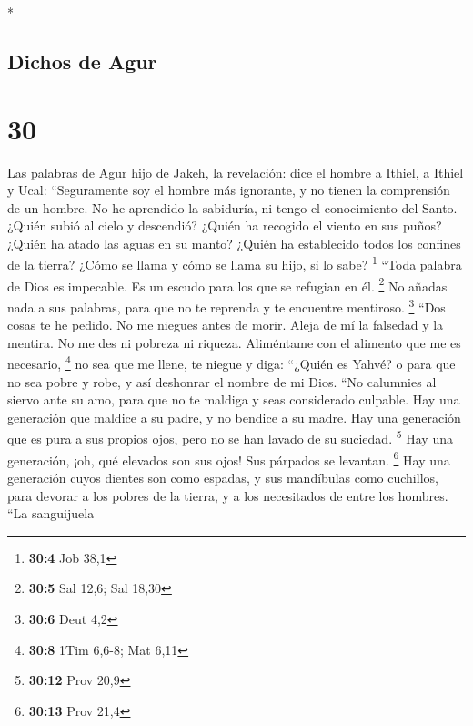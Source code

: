 \begin{paracol}{2}
\begin{otherlanguage}{english}
\end{otherlanguage}

\switchcolumn[0]*

\hypertarget{dichos-de-agur}{%
\subsection{Dichos de Agur}\label{dichos-de-agur}}

\hypertarget{section-58}{%
\section{30}\label{section-58}}

 Las palabras de Agur hijo de Jakeh, la revelación: dice
el hombre a Ithiel, a Ithiel y Ucal:  ``Seguramente soy el
hombre más ignorante, y no tienen la comprensión de un hombre.
 No he aprendido la sabiduría, ni tengo el conocimiento
del Santo.  ¿Quién subió al cielo y descendió? ¿Quién ha
recogido el viento en sus puños? ¿Quién ha atado las aguas en su manto?
¿Quién ha establecido todos los confines de la tierra? ¿Cómo se llama y
cómo se llama su hijo, si lo sabe? \footnote{\textbf{30:4} Job 38,1}
 ``Toda palabra de Dios es impecable. Es un escudo para
los que se refugian en él. \footnote{\textbf{30:5} Sal 12,6; Sal 18,30}
 No añadas nada a sus palabras, para que no te reprenda y
te encuentre mentiroso. \footnote{\textbf{30:6} Deut 4,2} 
``Dos cosas te he pedido. No me niegues antes de morir. 
Aleja de mí la falsedad y la mentira. No me des ni pobreza ni riqueza.
Aliméntame con el alimento que me es necesario, \footnote{\textbf{30:8}
  1Tim 6,6-8; Mat 6,11}  no sea que me llene, te niegue y
diga: ``¿Quién es Yahvé? o para que no sea pobre y robe, y así deshonrar
el nombre de mi Dios.  ``No calumnies al siervo ante su
amo, para que no te maldiga y seas considerado culpable. 
Hay una generación que maldice a su padre, y no bendice a su madre.
 Hay una generación que es pura a sus propios ojos, pero
no se han lavado de su suciedad. \footnote{\textbf{30:12} Prov 20,9}
 Hay una generación, ¡oh, qué elevados son sus ojos! Sus
párpados se levantan. \footnote{\textbf{30:13} Prov 21,4}
 Hay una generación cuyos dientes son como espadas, y sus
mandíbulas como cuchillos, para devorar a los pobres de la tierra, y a
los necesitados de entre los hombres.  ``La sanguijuela

\end{paracol}
